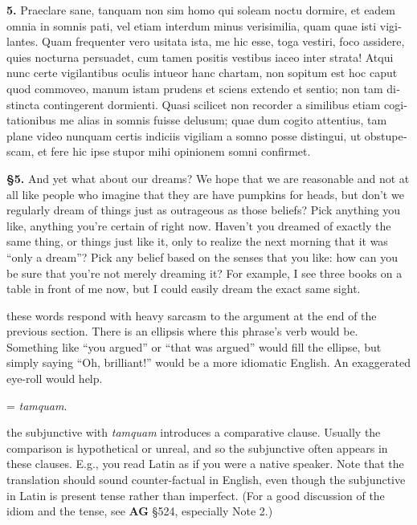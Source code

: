 \beginnumbering
\pstart
\begin{latin}
\textenglish{\textbf{5.}} Praeclare sane, tanquam non sim homo qui soleam noctu dormire, et eadem omnia in somnis pati, vel etiam interdum minus verisimilia, quam quae isti vigilantes. Quam frequenter vero usitata ista, me hic esse, toga vestiri, foco assidere, quies nocturna persuadet, cum tamen positis vestibus iaceo inter strata! Atqui nunc certe vigilantibus oculis intueor hanc chartam, non sopitum est hoc caput quod commoveo, manum istam prudens et sciens extendo et sentio; non tam distincta contingerent dormienti. Quasi scilicet non recorder a similibus etiam cogitationibus me alias in somnis fuisse delusum; quae dum cogito attentius, tam plane video nunquam certis indiciis vigiliam a somno posse distingui, ut obstupescam, et fere hic ipse stupor mihi opinionem somni confirmet.
\end{latin}
\pend
\endnumbering

\prenotes

\textbf{§5.} And yet what about our dreams? We hope that we are reasonable and not at all like people who imagine that they are have pumpkins for heads, but don't we regularly dream of things just as outrageous as those beliefs? Pick anything you like, anything you're certain of right now. Haven't you dreamed of exactly the same thing, or things just like it, only to realize the next morning that it was ``only a dream''? Pick any belief based on the senses that you like: how can you be sure that you're not merely dreaming it? For example, I see three books on a table in front of me now, but I could easily dream the exact same sight.

 these words respond with heavy sarcasm to the argument at the end of the previous section. There is an ellipsis where this phrase's verb would be. Something like ``you argued'' or ``that was argued'' would fill the ellipse, but simply saying ``Oh, brilliant!'' would be a more idiomatic English. An exaggerated eye-roll would help.

 = \textit{tamquam}.

 the subjunctive with \textit{tamquam} introduces a comparative clause. Usually the comparison is hypothetical or unreal, and so the subjunctive often appears in these clauses. E.g., you read Latin as if you were a native speaker. Note that the translation should sound counter-factual in English, even though the subjunctive in Latin is present tense rather than imperfect. (For a good discussion of the idiom and the tense, see \textbf{AG} §524, especially Note 2.)


